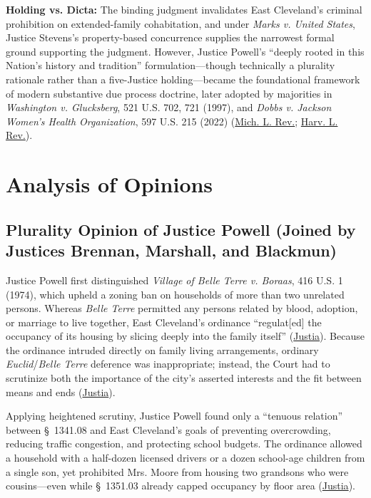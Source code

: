 \documentclass[12pt]{article}
\begin{document}
\textbf{Holding vs. Dicta:} The binding judgment invalidates East Cleveland's criminal prohibition on extended-family cohabitation, and under \textit{Marks v. United States}, Justice Stevens's property-based concurrence supplies the narrowest formal ground supporting the judgment. However, Justice Powell's ``deeply rooted in this Nation's history and tradition'' formulation---though technically a plurality rationale rather than a five-Justice holding---became the foundational framework of modern substantive due process doctrine, later adopted by majorities in \textit{Washington v. Glucksberg}, 521 U.S. 702, 721 (1997), and \textit{Dobbs v. Jackson Women's Health Organization}, 597 U.S. 215 (2022) (\href{https://repository.law.umich.edu/cgi/viewcontent.cgi?article=4069&context=facarticles}{Mich. L. Rev.}; \href{https://harvardlawreview.org/print/vol-139/the-history-and-tradition-of-substantive-due-process-in-state-constitutions/}{Harv. L. Rev.}).

\section{Analysis of Opinions}

\subsection{Plurality Opinion of Justice Powell (Joined by Justices Brennan, Marshall, and Blackmun)}
Justice Powell first distinguished \textit{Village of Belle Terre v. Boraas}, 416 U.S. 1 (1974), which upheld a zoning ban on households of more than two unrelated persons. Whereas \textit{Belle Terre} permitted any persons related by blood, adoption, or marriage to live together, East Cleveland's ordinance ``regulat[ed] the occupancy of its housing by slicing deeply into the family itself'' (\href{https://supreme.justia.com/cases/federal/us/431/494/}{Justia}). Because the ordinance intruded directly on family living arrangements, ordinary \textit{Euclid}/\textit{Belle Terre} deference was inappropriate; instead, the Court had to scrutinize both the importance of the city's asserted interests and the fit between means and ends (\href{https://supreme.justia.com/cases/federal/us/431/494/}{Justia}).

Applying heightened scrutiny, Justice Powell found only a ``tenuous relation'' between \S~1341.08 and East Cleveland's goals of preventing overcrowding, reducing traffic congestion, and protecting school budgets. The ordinance allowed a household with a half-dozen licensed drivers or a dozen school-age children from a single son, yet prohibited Mrs. Moore from housing two grandsons who were cousins---even while \S~1351.03 already capped occupancy by floor area (\href{https://supreme.justia.com/cases/federal/us/431/494/}{Justia}).
\end{document}
